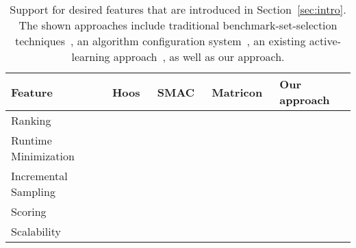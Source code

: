 \documentclass[runningheads]{llncs}
\newcommand{\cmark}{\ding{51}} %
\newcommand{\xmark}{\ding{55}}
\begin{document}


\begin{table}[tbp]
  \centering
  \begin{tabular}{
    m{}
    >{\centering\arraybackslash}m{}
    >{\centering\arraybackslash}m{}
    >{\centering\arraybackslash}m{}
    >{\centering\arraybackslash}m{}
  }
    \hline
    Feature & Hoos~\cite{HoosKSS13} & SMAC~\cite{HutterHL11} & Matricon~\cite{MatriconAFSH21} & Our approach \\
    \hline
    Ranking & \cmark & \xmark & \cmark & \cmark \\
    Runtime Minimization & \xmark & \cmark & \cmark & \cmark \\
    Incremental Sampling & \xmark & \xmark & \cmark & \cmark \\
    Scoring & \cmark & \xmark & \xmark & \cmark \\
    Scalability & \cmark & \cmark & \xmark & \cmark \\
    \hline
  \end{tabular}
  ~\\[1em]
  \caption{Support for desired features that are introduced in Section~\ref{sec:intro}.
	The shown approaches include traditional benchmark-set-selection techniques~\cite{HoosKSS13}, an algorithm configuration system~\cite{HutterHL11}, an existing active-learning approach~\cite{MatriconAFSH21}, as well as our approach.
  }
  \label{tab:requirements}
\end{table}
\end{document}
